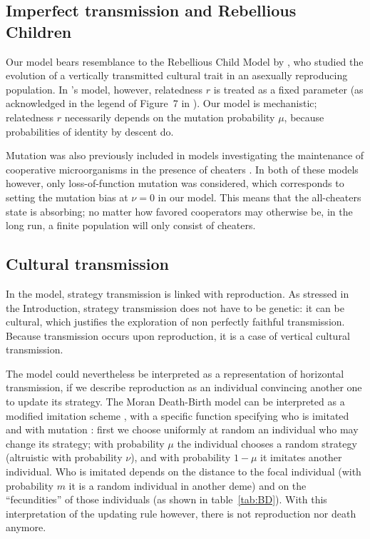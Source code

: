 \documentclass[11pt, letterpaper]{article}
\newcommand{\mutbias}{\nu}
\begin{document}
\subsection*{Imperfect transmission and Rebellious Children}
Our model bears resemblance to the Rebellious Child Model by \citet{Frank1997}, who studied the evolution of a vertically transmitted cultural trait in an asexually reproducing population. In \citeauthor{Frank1997}'s model, however, relatedness $r$ is treated as a fixed parameter (as acknowledged in the legend of Figure~7 in \citet{Frank1997}). 
Our model is mechanistic; relatedness $r$ necessarily depends on the mutation probability $\mu$, because probabilities of identity by descent do. 

Mutation was also previously included in models investigating the maintenance of cooperative microorganisms in the presence of cheaters \citep{Brockhurst2007, Frank2010}. In both of these models however, only loss-of-function mutation was considered, which corresponds to setting the mutation bias at $\mutbias=0$ in our model. This means that the all-cheaters state is absorbing; no matter how favored cooperators may otherwise be, in the long run, a finite population will only consist of cheaters. 

\subsection*{Cultural transmission}
In the model, strategy transmission is linked with reproduction. As stressed in the Introduction, strategy transmission does not have to be genetic: it can be cultural, which justifies the exploration of non perfectly faithful transmission. Because transmission occurs upon reproduction, it is a case of vertical cultural transmission. 

The model could nevertheless be interpreted as a representation of horizontal transmission, if we describe reproduction as an individual convincing another one to update its strategy. The Moran Death-Birth model can be interpreted as a modified imitation scheme \citep{BoydRicherson2002, Ohtsuki2005}, with a specific function specifying who is imitated and with mutation \citep{Kandori1993}: first we choose uniformly at random an individual who may change its strategy; with probability $\mu$ the individual chooses a random strategy (altruistic with probability $\mutbias$), and with probability $1-\mu$ it imitates another individual. Who is imitated depends on the distance to the focal individual (with probability $m$ it is a random individual in another deme) and on the ``fecundities'' of those individuals (as shown in table~\ref{tab:BD}). With this interpretation of the updating rule however, there is not reproduction nor death anymore. 
\end{document}

